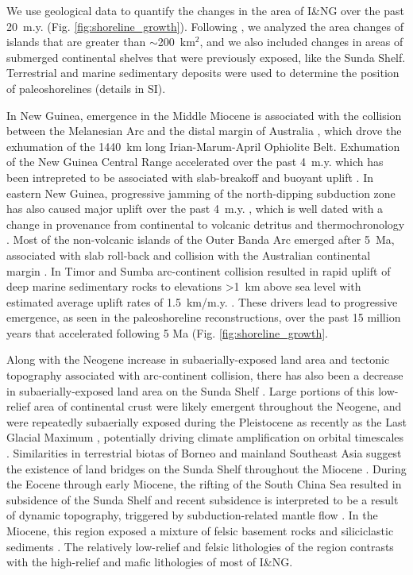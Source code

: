 \documentclass[11pt,letterpaper]{article}
\begin{document}
We use geological data to quantify the changes in the area of I\&NG over the past 20~m.y. (Fig. \ref{fig:shoreline_growth}). Following \citet{Molnar2015a}, we analyzed the area changes of islands that are greater than $\sim$200~km$^{2}$, and we also included changes in areas of submerged continental shelves that were previously exposed, like the Sunda Shelf. Terrestrial and marine sedimentary deposits were used to determine the position of paleoshorelines (details in SI). 

In New Guinea, emergence in the Middle Miocene is associated with the collision between the Melanesian Arc and the distal margin of Australia \citep{vanUfford2005a, Cloos2005a, Baldwin2012a}, which drove the exhumation of the 1440~km long Irian-Marum-April Ophiolite Belt. Exhumation of the New Guinea Central Range accelerated over the past 4~m.y. which has been intrepreted to be associated with slab-breakoff and buoyant uplift \citep{Cloos2005a}. In eastern New Guinea, progressive jamming of the north-dipping subduction zone has also caused major uplift over the past 4~m.y. \citep{vanUfford2005a}, which is well dated with a change in provenance from continental to volcanic detritus \citep{Abbott1994a} and thermochronology \citep{Hill1989a}. Most of the non-volcanic islands of the Outer Banda Arc emerged after 5~Ma, associated with slab roll-back and collision with the Australian continental margin \citep{Harris2006a, Hall2013b}. In Timor and Sumba arc-continent collision resulted in rapid uplift of deep marine sedimentary rocks to elevations \textgreater1~km above sea level with estimated average uplift rates of 1.5~km/m.y. \citep{AudleyCharles1986a}. These drivers lead to progressive emergence, as seen in the paleoshoreline reconstructions, over the past 15 million years that accelerated following 5 Ma (Fig. \ref{fig:shoreline_growth}.

Along with the Neogene increase in subaerially-exposed land area and tectonic topography associated with arc-continent collision, there has also been a decrease in subaerially-exposed land area on the Sunda Shelf \citep{Sarr2019a}. Large portions of this low-relief area of continental crust were likely emergent throughout the Neogene, and were repeatedly subaerially exposed during the Pleistocene as recently as the Last Glacial Maximum \citep{Hall2002a}, potentially driving climate amplification on orbital timescales \citep{DiNezio2018a}. Similarities in terrestrial biotas of Borneo and mainland Southeast Asia suggest the existence of land bridges on the Sunda Shelf throughout the Miocene \citep{Moss1998a}. During the Eocene through early Miocene, the rifting of the South China Sea resulted in subsidence of the Sunda Shelf \citep{Morley2013a} and recent subsidence is interpreted to be a result of dynamic topography, triggered by subduction-related mantle flow \citep{Sarr2019a}. In the Miocene, this region exposed a mixture of felsic basement rocks and siliciclastic sediments \citet{Darmadi2007a}. The relatively low-relief and felsic lithologies of the region contrasts with the high-relief and mafic lithologies of most of I\&NG.
\end{document}
